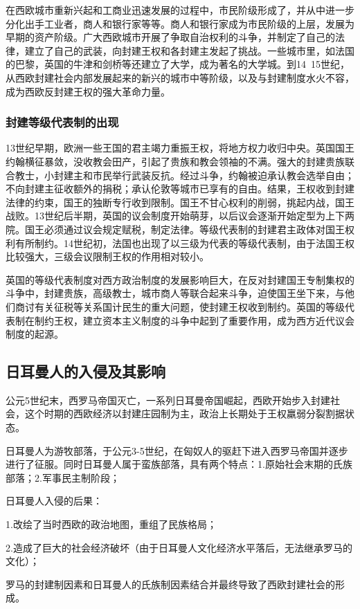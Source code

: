在西欧城市重新兴起和工商业迅速发展的过程中，市民阶级形成了，并从中进一步分化出手工业者，商人和银行家等等。商人和银行家成为市民阶级的上层，发展为早期的资产阶级。广大西欧城市开展了争取自治权利的斗争，并制定了自己的法律，建立了自己的武装，向封建王权和各封建主发起了挑战。一些城市里，如法国的巴黎，英国的牛津和剑桥等还建立了大学，成为著名的大学城。到14~15世纪，从西欧封建社会内部发展起来的新兴的城市中等阶级，以及与封建制度水火不容，成为西欧反封建王权的强大革命力量。

\subsubsection{封建等级代表制的出现}
13世纪早期，欧洲一些王国的君主竭力重振王权，将地方权力收归中央。英国国王约翰横征暴敛，没收教会田产，引起了贵族和教会领袖的不满。强大的封建贵族联合教士，小封建主和市民举行武装反抗。经过斗争，约翰被迫承认教会选举自由；不向封建主征收额外的捐税；承认伦敦等城市已享有的自由。结果，王权收到封建法律的约束，国王的独断专行收到限制。国王不甘心权利的削弱，挑起内战，国王战败。13世纪后半期，英国的议会制度开始萌芽，以后议会逐渐开始定型为上下两院。国王必须通过议会规定赋税，制定法律。等级代表制的封建君主政体对国王权利有所制约。14世纪初，法国也出现了以三级为代表的等级代表制，由于法国王权比较强大，三级会议限制王权的作用相对较小。

英国的等级代表制度对西方政治制度的发展影响巨大，在反对封建国王专制集权的斗争中，封建贵族，高级教士，城市商人等联合起来斗争，迫使国王坐下来，与他们商讨有关征税等关系国计民生的重大问题，使封建王权收到制约。英国的等级代表制在制约王权，建立资本主义制度的斗争中起到了重要作用，成为西方近代议会制度的起源。


\subsection{日耳曼人的入侵及其影响}
公元5世纪末，西罗马帝国灭亡，一系列日耳曼帝国崛起，西欧开始步入封建社会，这个时期的西欧经济以封建庄园制为主，政治上长期处于王权羸弱分裂割据状态。

日耳曼人为游牧部落，于公元3-5世纪，在匈奴人的驱赶下进入西罗马帝国并逐步进行了征服。同时日耳曼人属于蛮族部落，具有两个特点：1.原始社会末期的氏族部落；2.军事民主制阶段；

日耳曼人入侵的后果：

1.改绘了当时西欧的政治地图，重组了民族格局；

2.造成了巨大的社会经济破坏（由于日耳曼人文化经济水平落后，无法继承罗马的文化）；

罗马的封建制因素和日耳曼人的氏族制因素结合并最终导致了西欧封建社会的形成。

